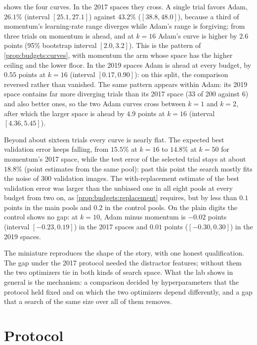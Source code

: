 \begin{refsection}
 shows the four curves. In the 2017 spaces they cross. A single trial favors Adam, $26.1\%$ (interval $[25.1,27.1]$) against $43.2\%$ ($[38.8,48.0]$), because a third of momentum's learning-rate range diverges while Adam's range is forgiving; from three trials on momentum is ahead, and at $k=16$ Adam's curve is higher by $2.6$ points (95\% bootstrap interval $[2.0,3.2]$). This is the pattern of \cref{prop:budgets:curves}, with momentum the arm whose space has the higher ceiling and the lower floor. In the 2019 spaces Adam is ahead at every budget, by $0.55$ points at $k=16$ (interval $[0.17,0.90]$): on this split, the comparison reversed rather than vanished. The same pattern appears within Adam: its 2019 space contains far more diverging trials than its 2017 space (33 of 200 against 6) and also better ones, so the two Adam curves cross between $k=1$ and $k=2$, after which the larger space is ahead by $4.9$ points at $k=16$ (interval $[4.36,5.45]$).

Beyond about sixteen trials every curve is nearly flat. The expected best validation error keeps falling, from $15.5\%$ at $k=16$ to $14.8\%$ at $k=50$ for momentum's 2017 space, while the test error of the selected trial stays at about $18.8\%$ (point estimates from the same pool): past this point the search mostly fits the noise of 300 validation images. The with-replacement estimate of the best validation error was larger than the unbiased one in all eight pools at every budget from two on, as \cref{prop:budgets:replacement} requires, but by less than $0.1$ points in the main pools and $0.2$ in the control pools. On the plain digits the control shows no gap: at $k=10$, Adam minus momentum is $-0.02$ points (interval $[-0.23,0.19]$) in the 2017 spaces and $0.01$ points ($[-0.30,0.30]$) in the 2019 spaces.

The miniature reproduces the shape of the story, with one honest qualification. The gap under the 2017 protocol needed the distractor features; without them the two optimizers tie in both kinds of search space. What the lab shows in general is the mechanism: a comparison decided by hyperparameters that the protocol held fixed and on which the two optimizers depend differently, and a gap that a search of the same size over all of them removes.

\section{Protocol}\label{sec:budgets:protocol}


\end{refsection}
